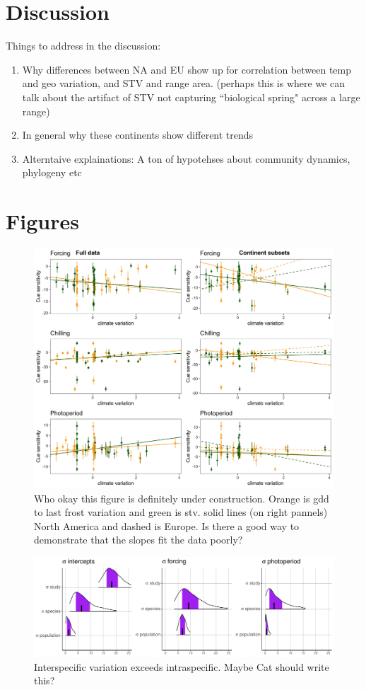 \documentclass[12pt]{article}\usepackage[]{graphicx}\usepackage[]{color}
\begin{document}
\section*{Discussion}
Things to address in the discussion:
\begin{enumerate}
\item Why differences between NA and EU show up for correlation between temp and geo variation, and STV and range area. (perhaps this is where we can talk about the artifact of STV not capturing ``biological spring" across a large range)
\item In general why these continents show different trends
\item Alterntaive explainations: A ton of hypotehses about community dynamics, phylogeny etc

\end{enumerate}


\section*{Figures}

\begin{figure}[h!]
    \centering
 \includegraphics[width=\textwidth]{..//..//analyses/ranges/figures/mock1.jpeg} 
    \caption{Who okay this figure is definitely under construction. Orange is gdd to last frost variation and green is stv. solid lines (on right pannels) North America and dashed is Europe. Is there a good way to demonstrate that the slopes fit the data poorly? }
    \label{fig:mods}
\end{figure}


\begin{figure}[h!]
    \centering
 \includegraphics[width=\textwidth]{..//..//analyses/ranges/figures/variancepartitioning.pdf} 
    \caption{Interspecific variation exceeds intraspecific.  Maybe Cat should write this?}
    \label{fig:popy}
\end{figure}
\end{document}
